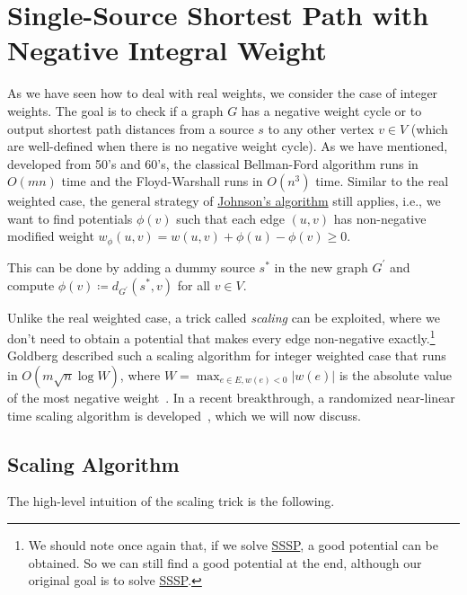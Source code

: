 \section{Single-Source Shortest Path with Negative Integral Weight}\label{sec:SSSP-with-negative-integral-weights}
As we have seen how to deal with real weights, we consider the case of integer weights. The goal is to check if a graph \(G\) has a negative weight cycle or to output shortest path distances from a source \(s\) to any other vertex \(v \in V\) (which are well-defined when there is no negative weight cycle). As we have mentioned, developed from 50's and 60's, the classical Bellman-Ford algorithm runs in \(O(mn)\) time and the Floyd-Warshall runs in \(O(n^3)\) time. Similar to the real weighted case, the general strategy of \hyperref[prev:Johnson-algorithm]{Johnson's algorithm} still applies, i.e., we want to find potentials \(\phi (v)\) such that each edge \((u, v)\) has non-negative modified weight \(w_{\phi }(u, v) = w(u, v) + \phi (u) - \phi (v) \geq 0\).

\begin{prev}
	This can be done by adding a dummy source \(s^{\ast} \) in the new graph \(G^{\prime} \) and compute \(\phi (v) \coloneqq d_{G^{\prime} }(s^{\ast} , v)\) for all \(v \in V\).
\end{prev}

Unlike the real weighted case, a trick called \emph{scaling} can be exploited, where we don't need to obtain a potential that makes every edge non-negative exactly.\footnote{We should note once again that, if we solve \hyperref[prb:SSSP]{SSSP}, a good potential can be obtained. So we can still find a good potential at the end, although our original goal is to solve \hyperref[prb:SSSP]{SSSP}.} Goldberg described such a scaling algorithm for integer weighted case that runs in \(O(m \sqrt{n} \log W)\), where \(W = \max _{e \in E, w(e) < 0} \lvert w(e) \rvert \) is the absolute value of the most negative weight~\cite{goldberg1995scaling}. In a recent breakthrough, a randomized near-linear time scaling algorithm is developed~\cite{bernstein2022negative,bringmann2023negative}, which we will now discuss.

\subsection{Scaling Algorithm}
The high-level intuition of the scaling trick is the following.

